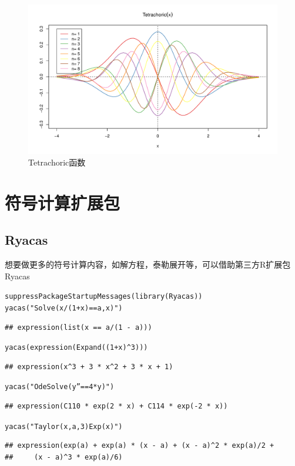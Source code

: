 \documentclass[a4paper]{ctexart}\usepackage[]{graphicx}\usepackage[]{color}
\makeatletter
\newcommand{\hlnum}[1]{\textcolor[rgb]{0.502,0.086,1}{#1}}%
\newcommand{\hlstr}[1]{\textcolor[rgb]{1,0.4,0.2}{#1}}%
\newcommand{\hlopt}[1]{\textcolor[rgb]{0.251,0.251,0.251}{#1}}%
\newcommand{\hlstd}[1]{\textcolor[rgb]{0.251,0.251,0.251}{#1}}%
\newcommand{\hlkwd}[1]{\textcolor[rgb]{0.69,0.188,0.941}{#1}}%
\newenvironment{kframe}{%
 \def\at@end@of@kframe{}%
 \ifinner\ifhmode%
  \def\at@end@of@kframe{\end{minipage}}%
  \begin{minipage}{\columnwidth}%
 \fi\fi%
 \def\FrameCommand##1{\hskip\@totalleftmargin \hskip-\fboxsep
 \colorbox{shadecolor}{##1}\hskip-\fboxsep
     \hskip-\linewidth \hskip-\@totalleftmargin \hskip\columnwidth}%
 \MakeFramed {\advance\hsize-\width
   \@totalleftmargin\z@ \linewidth\hsize
   \@setminipage}}%
 {\par\unskip\endMakeFramed%
 \at@end@of@kframe}
\newenvironment{knitrout}{}{} %
\makeatother
\begin{document}
\begin{figure}[htb]
  \centering
    \includegraphics[width=.8\textwidth,height=.4\textwidth]{figure/Tetrachoric.pdf}
  \caption{Tetrachoric函数}
\end{figure} 

\section{符号计算扩展包}
\subsection{Ryacas}
想要做更多的符号计算内容，如解方程，泰勒展开等，可以借助第三方R扩展包Ryacas \cite{Ryacas}

\begin{knitrout}
\color{fgcolor}\begin{kframe}
\begin{alltt}
\hlkwd{suppressPackageStartupMessages}\hlstd{(}\hlkwd{library}\hlstd{(Ryacas))}
\hlkwd{yacas}\hlstd{(}\hlstr{"Solve(x/(1+x) == a, x)"}\hlstd{)}
\end{alltt}
\begin{verbatim}
## expression(list(x == a/(1 - a)))
\end{verbatim}
\begin{alltt}
\hlkwd{yacas}\hlstd{(}\hlkwd{expression}\hlstd{(}\hlkwd{Expand}\hlstd{((}\hlnum{1}\hlopt{+}\hlstd{x)}\hlopt{^}\hlnum{3}\hlstd{)))}
\end{alltt}
\begin{verbatim}
## expression(x^3 + 3 * x^2 + 3 * x + 1)
\end{verbatim}
\begin{alltt}
\hlkwd{yacas}\hlstd{(}\hlstr{"OdeSolve(y''==4*y)"}\hlstd{)}
\end{alltt}
\begin{verbatim}
## expression(C110 * exp(2 * x) + C114 * exp(-2 * x))
\end{verbatim}
\begin{alltt}
\hlkwd{yacas}\hlstd{(}\hlstr{"Taylor(x,a,3) Exp(x)"}\hlstd{)}
\end{alltt}
\begin{verbatim}
## expression(exp(a) + exp(a) * (x - a) + (x - a)^2 * exp(a)/2 + 
##     (x - a)^3 * exp(a)/6)
\end{verbatim}
\end{kframe}
\end{knitrout}
\end{document}
